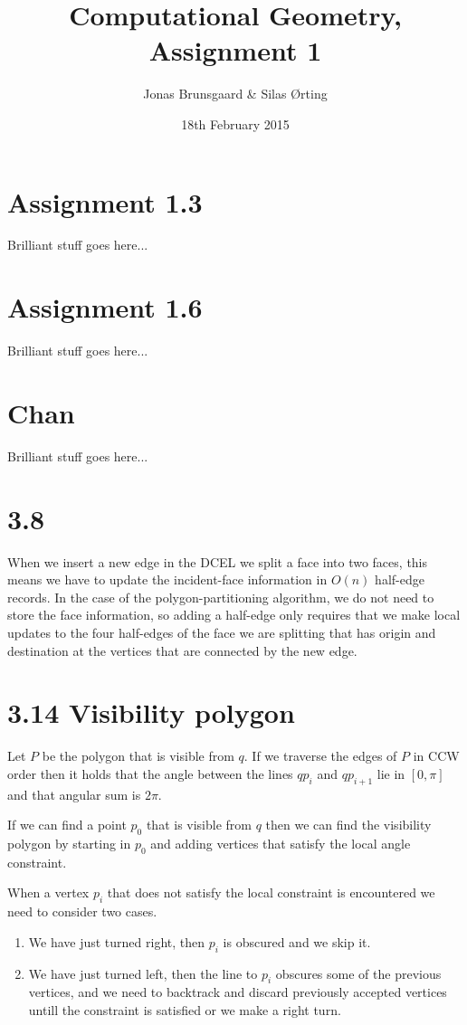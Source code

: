 \documentclass[10pt,a4paper,final,oneside,openany,article]{memoir}
\title{Computational Geometry, Assignment 1}
\author{
    Jonas Brunsgaard \& Silas Ørting
}
\date{18th February 2015}
\begin{document}
\maketitle

\chapter*{Assignment 1.3}
Brilliant stuff goes here...

\chapter*{Assignment 1.6}
Brilliant stuff goes here...

\chapter*{Chan}
Brilliant stuff goes here...

\chapter*{3.8}
When we insert a new edge in the DCEL we split a face into two faces, this means we have to update the incident-face information in $O(n)$ half-edge records. In the case of the polygon-partitioning algorithm, we do not need to store the face information, so adding a half-edge only requires that we make local updates to the four half-edges of the face we are splitting that has origin and destination at the vertices that are connected by the new edge. 

\chapter*{3.14 Visibility polygon}
Let $P$ be the polygon that is visible from $q$. If we traverse the edges of $P$ in CCW order then it holds that the angle between the lines $qp_i$ and $qp_{i+1}$ lie in $[0, \pi]$ and that angular sum is $2\pi$.

If we can find a point $p_0$ that is visible from $q$ then we can find the visibility polygon by starting in $p_0$ and adding vertices that satisfy the local angle constraint.

When a vertex $p_i$ that does not satisfy the local constraint is encountered we need to consider two cases. 
\begin{enumerate}
\item We have just turned right, then $p_i$ is obscured and we skip it.
\item We have just turned left, then the line to $p_i$ obscures some of the previous vertices, and we need to backtrack and discard previously accepted vertices untill the constraint is satisfied or we make a right turn. 
\end{enumerate}
\end{document}
